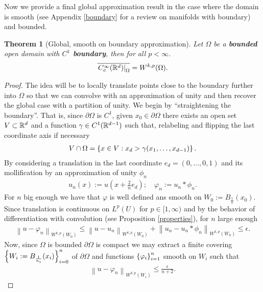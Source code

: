 \documentclass[12pt]{article}
\newtheorem{theorem}{Theorem}
\theoremstyle{remark}
\newcommand{\qt}[1]{\left(#1\right)}
\renewcommand{\norm}[1]{\left\lVert #1 \right\rVert}\renewcommand{\abs}[1]{\left| #1 \right|}
\newcommand\restr[2]{\left.#1\right|_{#2}}
\begin{document}
Now we provide a final global approximation result in the case where the domain is smooth (see Appendix \ref{boundary} for a review on manifolds with boundary) and bounded.
\begin{theorem}[Global, smooth on boundary approximation]\label{global} Let  $\Omega$ be a \textbf{bounded} open domain with  \textbf{$C^1$ boundary}, then for all $p<\infty$.
	\begin{align*}
		\overline{\restr{C_c^\infty(\R^d)}{\Omega}}= W^{k,p}(\Omega).
	\end{align*}
\end{theorem}
\begin{proof}
	The idea will be to locally translate points close to the boundary further into $\Omega$ so that we can convolve with an approximation of unity and then recover the global case with a partition of unity. We begin by ``straightening the boundary''. That is, since $ \partial \Omega$ is $C^1$,  given $x_0 \in \partial  \Omega$ there exists an open set $V \subset \mathbb{R}^d$ and a function  $\gamma \in  C^1(\mathbb{R}^{d-1})$ such that, relabeling  and flipping the last coordinate axis if necessary
	\begin{align*}
		V \cap \Omega = \left\{x \in V :x_d  >\gamma (x_1,\ldots,x_{d-1})\right\}  .
	\end{align*}
	By considering a translation in the last coordinate $e_d=(0,\ldots,0,1)$ and its mollification by an approximation of unity $\phi_n$
	\begin{align*}
		u_n(x):= u\qt{x+ \frac{2}{n}e_d }; \quad \varphi_n:= u_n *\phi_n .
	\end{align*}
	For $n$ big enough we have that  $\varphi$ is well defined ans smooth on $W_0:=B_{\frac{1}{n}}(x_0)$. Since translation is continuous on $L^p(U)$ for  $p \in [1,\infty)$ and by the behavior of differentiation with convolution  (see Proposition \ref{properties}), for $n$ large enough
	\begin{align*}
		\norm{u -\varphi_n}_{W^{k,p}(W_0)}\leq \norm{u -u_n}_{W^{k,p}(W_0)}+\norm{u_n -u_n*\phi_n}_{W^{k,p}(W_0)}\leq \epsilon.
	\end{align*}
	Now, since $\Omega$ is bounded $\partial \Omega$ is compact we may extract a finite covering $\left\{W_i:=B_{\frac{1}{n_i}}(x_i)\right\}_{i=0}^n $ of  $\partial \Omega$ and functions $\left\{\varphi_i\right\}_{i=1}^n$ smooth on $W_i$ such that
	\begin{align*}
		\norm{u -\varphi_n}_{W^{k,p}(W_i)}\leq \frac{\epsilon}{n+2}  .
	\end{align*}


\end{proof}
\end{document}

